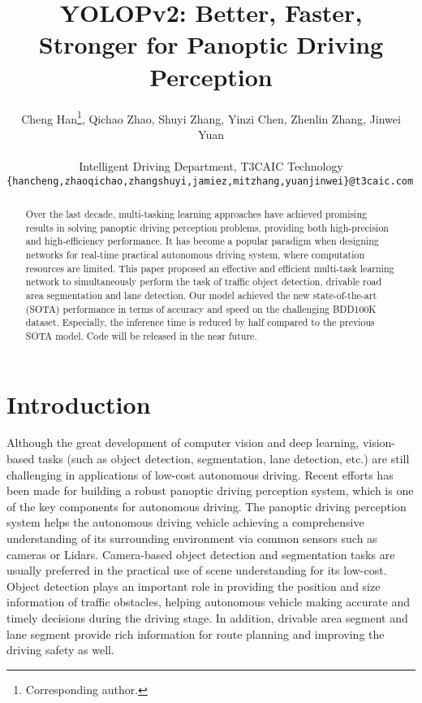 \documentclass[10pt,twocolumn,letterpaper]{article}
\begin{document}
\title{YOLOPv2: Better, Faster, Stronger for Panoptic Driving Perception}



\author{Cheng Han\thanks{Corresponding author.}, Qichao Zhao, Shuyi Zhang, Yinzi Chen, Zhenlin Zhang, Jinwei Yuan\\
\\
{\small  Intelligent Driving Department,  T3CAIC Technology}  \\
{\tt\small \{hancheng,zhaoqichao,zhangshuyi,jamiez,mitzhang,yuanjinwei\}@t3caic.com
}
}
\maketitle
\ificcvfinal\thispagestyle{empty}\fi

\begin{abstract}
Over the last decade, multi-tasking learning approaches have achieved promising results in solving panoptic driving perception problems, providing both high-precision and high-efficiency performance. It has become a popular paradigm when designing networks for real-time practical autonomous driving system, where computation resources are limited.
This paper proposed an effective and efficient multi-task learning network to simultaneously perform the task of traffic object detection, drivable road area segmentation and lane detection. Our model achieved the new state-of-the-art (SOTA) performance in terms of accuracy and speed on the challenging BDD100K dataset. Especially, the inference time is reduced by half compared to the previous SOTA model.
Code will be released in the near future.

\end{abstract}

\section{Introduction}
Although the great development of computer vision and deep learning, vision-based tasks (such as object detection, segmentation, lane detection, etc.) are still challenging in applications of low-cost autonomous driving. Recent efforts has been made for building a robust panoptic driving perception system, which is one of the key components for autonomous driving. The panoptic driving perception system helps the autonomous driving vehicle achieving a comprehensive understanding of its surrounding environment via common sensors such as cameras or Lidars. Camera-based object detection and segmentation tasks are usually preferred in the practical use of scene understanding for its low-cost.
Object detection plays an important role in providing the position and size information of traffic obstacles, helping autonomous vehicle making accurate and timely decisions during the driving stage.
In addition, drivable area segment and lane segment provide rich information for route planning and improving the driving safety as well.
\end{document}
